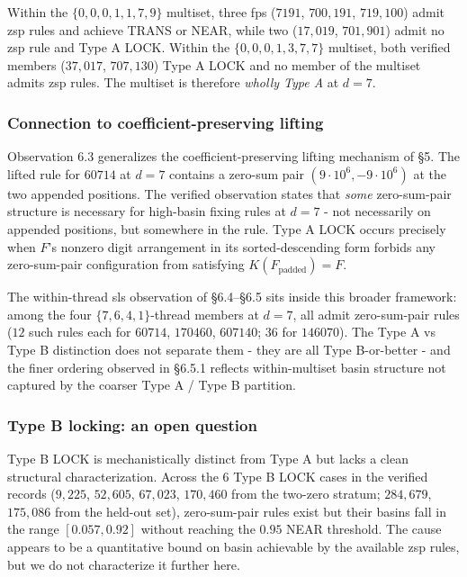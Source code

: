 \documentclass[11pt,letterpaper]{article}
\theoremstyle{paperstyle}
\theoremstyle{paperstyledef}
\theoremstyle{paperstylerem}
\begin{document}
Within the \(\{0, 0, 0, 1, 1, 7, 9\}\) multiset, three fps (\(7191\),
\(700{,}191\), \(719{,}100\)) admit zsp rules and achieve TRANS or NEAR,
while two (\(17{,}019\), \(701{,}901\)) admit no zsp rule and Type A
LOCK. Within the \(\{0, 0, 0, 1, 3, 7, 7\}\) multiset, both verified
members (\(37{,}017\), \(707{,}130\)) Type A LOCK and no member of the
multiset admits zsp rules. The multiset is therefore \emph{wholly Type
A} at \(d = 7\).

\hypertarget{connection-to-coefficient-preserving-lifting}{%
\subsubsection{Connection to coefficient-preserving lifting}\label{connection-to-coefficient-preserving-lifting}}

Observation 6.3 generalizes the coefficient-preserving lifting mechanism
of §5. The lifted rule for \(60714\) at \(d = 7\) contains a zero-sum
pair \((9 \cdot 10^6, -9 \cdot 10^6)\) at the two appended positions.
The verified observation states that \emph{some} zero-sum-pair structure
is necessary for high-basin fixing rules at \(d = 7\) - not
necessarily on appended positions, but somewhere in the rule. Type A
LOCK occurs precisely when \(F\)'s nonzero digit arrangement in its
sorted-descending form forbids any zero-sum-pair configuration from
satisfying \(K(F_{\text{padded}}) = F\).

The within-thread sls observation of §6.4--§6.5 sits inside this broader
framework: among the four \(\{7, 6, 4, 1\}\)-thread members at
\(d = 7\), all admit zero-sum-pair rules (\(12\) such rules each for
\(60714\), \(170460\), \(607140\); \(36\) for \(146070\)). The Type A vs
Type B distinction does not separate them - they are all Type
B-or-better - and the finer ordering observed in §6.5.1 reflects
within-multiset basin structure not captured by the coarser Type A /
Type B partition.

\hypertarget{type-b-locking-an-open-question}{%
\subsubsection{Type B locking: an open question}\label{type-b-locking-an-open-question}}

Type B LOCK is mechanistically distinct from Type A but lacks a clean
structural characterization. Across the \(6\) Type B LOCK cases in the
verified records (\(9{,}225\), \(52{,}605\), \(67{,}023\), \(170{,}460\)
from the two-zero stratum; \(284{,}679\), \(175{,}086\) from the
held-out set), zero-sum-pair rules exist but their basins fall in the
range \([0.057, 0.92]\) without reaching the \(0.95\) NEAR threshold.
The cause appears to be a quantitative bound on basin achievable by the
available zsp rules, but we do not characterize it further here.
\end{document}

